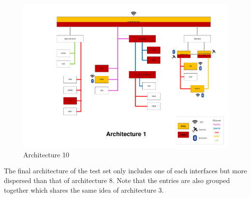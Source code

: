 \begin{figure}[h!]
    \caption{Architecture 10}
    \includegraphics[width=\textwidth, page=10]{../Architectures-survey.pdf}
\end{figure}

The final architecture of the test set only includes one of each interfaces but more dispersed than that of architecture 8.
Note that the entries are also grouped together which shares the same idea of architecture 3.\\
